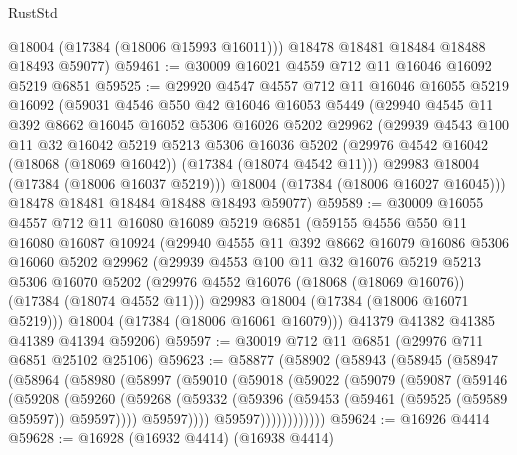 \begin{lexlean}{RustStd}
\begin{coremodule}
        @18004
        (@17384 (@18006 @15993 @16011)))
      @18478
      @18481
      @18484
      @18488
      @18493
      @59077)
@59461 := @30009 @16021 @4559 @712 @11 @16046 @16092 @5219 @6851
@59525 := @29920
    @4547
    @4557
    @712
    @11
    @16046
    @16055
    @5219
    @16092
    (@59031
      @4546
      @550
      @42
      @16046
      @16053
      @5449
      (@29940
        @4545
        @11
        @392
        @8662
        @16045
        @16052
        @5306
        @16026
        @5202
        @29962
        (@29939
          @4543
          @100
          @11
          @32
          @16042
          @5219
          @5213
          @5306
          @16036
          @5202
          (@29976 @4542 @16042 (@18068 (@18069 @16042)) (@17384 (@18074 @4542 @11)))
          @29983
          @18004
          (@17384 (@18006 @16037 @5219)))
        @18004
        (@17384 (@18006 @16027 @16045)))
      @18478
      @18481
      @18484
      @18488
      @18493
      @59077)
@59589 := @30009
    @16055
    @4557
    @712
    @11
    @16080
    @16089
    @5219
    @6851
    (@59155
      @4556
      @550
      @11
      @16080
      @16087
      @10924
      (@29940
        @4555
        @11
        @392
        @8662
        @16079
        @16086
        @5306
        @16060
        @5202
        @29962
        (@29939
          @4553
          @100
          @11
          @32
          @16076
          @5219
          @5213
          @5306
          @16070
          @5202
          (@29976 @4552 @16076 (@18068 (@18069 @16076)) (@17384 (@18074 @4552 @11)))
          @29983
          @18004
          (@17384 (@18006 @16071 @5219)))
        @18004
        (@17384 (@18006 @16061 @16079)))
      @41379
      @41382
      @41385
      @41389
      @41394
      @59206)
@59597 := @30019 @712 @11 @6851 (@29976 @711 @6851 @25102 @25106)
@59623 := @58877
    (@58902
      (@58943
        (@58945
          (@58947
            (@58964
              (@58980
                (@58997
                  (@59010
                    (@59018
                      (@59022
                        (@59079
                          (@59087
                            (@59146
                              (@59208
                                (@59260
                                  (@59268
                                    (@59332
                                      (@59396 (@59453 (@59461 (@59525 (@59589 @59597)) @59597))))
                                    @59597))))
                            @59597))))))))))))
@59624 := @16926 @4414
@59628 := @16928 (@16932 @4414) (@16938 @4414)

\end{coremodule}
\end{lexlean}
